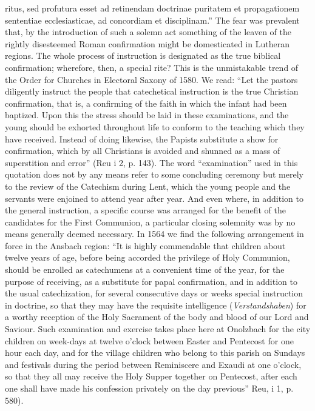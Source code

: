 ritus, sed profutura esset ad retinendam doctrinae puritatem et propagationem sententiae ecclesiasticae, ad concordiam et disciplinam.” The fear was prevalent that, by the introduction of such a solemn act something of the leaven of the rightly disesteemed Roman confirmation might be domesticated in Lutheran regions. The whole process of instruction is designated as the true biblical confirmation; wherefore, then, a special rite? This is the unmistakable trend of the Order for Churches in Electoral Saxony of 1580. We read: “Let the pastors diligently instruct the people that catechetical instruction is the true Christian confirmation, that is, a confirming of the faith in which the infant had been baptized. Upon this the stress should be laid in these examinations, and the young should be exhorted throughout life to conform to the teaching which they have received. Instead of doing likewise, the Papists substitute a show for confirmation, which by all Christians is avoided and shunned as a mass of superstition and error” (Reu i 2, p. 143). The word “examination” used in this quotation does not by any means refer to some concluding ceremony but merely to the review of the Catechism during Lent, which the young people and the servants were enjoined to attend year after year. And even where, in addition to the general instruction, a specific course was arranged for the benefit of the candidates for the First Communion, a particular closing solemnity was by no means generally deemed necessary. In 1564 we find the following arrangement in force in the Ansbach region: “It is highly commendable that children about twelve years of age, before being accorded the privilege of Holy Communion, should be enrolled as catechumens at a convenient time of the year, for the purpose of receiving, as a substitute for papal confirmation, and in addition to the usual catechization, for several consecutive days or weeks special instruction in doctrine, so that they may have the requisite intelligence (\emph{Verstandshaben}) for a worthy reception of the
Holy Sacrament of the body and blood of our Lord and Saviour. Such examination and exercise takes place here at Onolzbach for the city children on week-days at twelve o’clock between Easter and Pentecost for one hour each day, and for the village children who belong to this parish on Sundays and festivals during the period between Reminiscere and Exaudi at one o’clock, so that they all may receive the Holy Supper together on Pentecost, after each one shall have made his confession privately on the day previous” Reu, i 1, p. 580).

